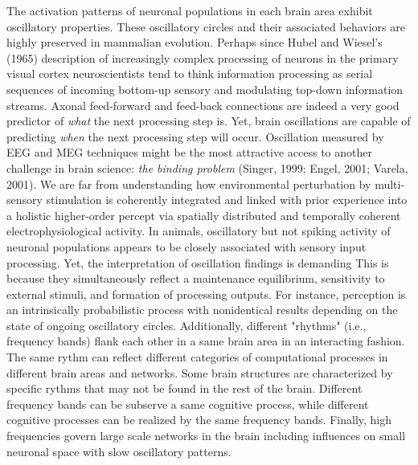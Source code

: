 \documentclass[authoryear,review,3p]{elsarticle}
\begin{document}
The activation patterns of neuronal populations in each brain area
exhibit oscillatory properties.
These oscillatory circles and their associated behaviors are
highly preserved in mammalian evolution.
%
Perhaps since Hubel and Wiesel's (1965) description of increasingly
complex processing of neurons in the primary visual cortex
neuroscientists tend to think information processing as
serial sequences of incoming bottom-up sensory and
modulating top-down information streams.
Axonal feed-forward and feed-back connections
are indeed a very good predictor of \textit{what} the next processing step is.
Yet, brain oscillations are capable of predicting \textit{when}
the next processing step will occur.
%
Oscillation measured by EEG and MEG techniques might be the most
attractive access to another challenge in brain science:
\textit{the binding problem} (Singer, 1999; Engel, 2001; Varela, 2001).
We are far from understanding how
environmental perturbation by multi-sensory stimulation
is coherently integrated and linked with prior experience into
a holistic higher-order percept via
spatially distributed and temporally coherent electrophysiological activity.
%
In animals, oscillatory but not spiking activity of neuronal populations appears
to be closely associated with sensory input processing.
Yet, the interpretation of oscillation findings is demanding
This is because they
simultaneously reflect
a maintenance equilibrium, sensitivity to external stimuli, and
formation of processing outputs.
For instance,
perception is an intrinsically probabilistic process with nonidentical
results depending on the state of ongoing oscillatory circles.
Additionally,
different "rhythms" (i.e., frequency bands) flank each other
in a same brain area in an interacting fashion.
The same rythm can reflect different categories of computational processes
in different brain areas and networks. Some brain structures are
characterized by specific rythms that may not be found in the rest
of the brain.
Different frequency bands can be subserve a same cognitive process, while
different cognitive processes can be realized by the same frequency bands.
%
Finally,
high frequencies govern large scale networks in the brain
including influences on small neuronal space
with slow oscillatory patterns.
\end{document}
